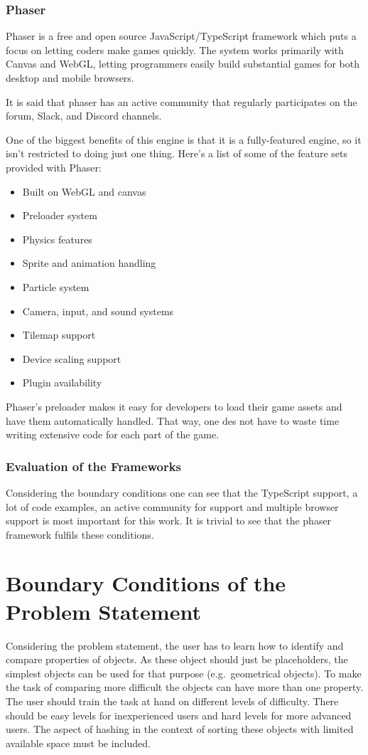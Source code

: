 \subsubsection{Phaser}
Phaser is a free and open source JavaScript/TypeScript framework which puts a focus on letting coders make games quickly.
The system works primarily with Canvas and WebGL, letting programmers easily build substantial games for both
desktop and mobile browsers.

It is said that phaser has an active community that regularly participates on the forum, Slack, and Discord channels.

One of the biggest benefits of this engine is that it is a fully-featured engine,
so it isn’t restricted to doing just one thing.
Here’s a list of some of the feature sets provided with Phaser:

\begin{itemize}
    \item Built on WebGL and canvas
    \item Preloader system
    \item Physics features
    \item Sprite and animation handling
    \item Particle system
    \item Camera, input, and sound systems
    \item Tilemap support
    \item Device scaling support
    \item Plugin availability
\end{itemize}

Phaser’s preloader makes it easy for developers to load their game assets and have them automatically handled.
That way, one des not have to waste time writing extensive code for each part of the game\cite{phaserad}.

\subsubsection{Evaluation of the Frameworks}
Considering the boundary conditions one can see that the TypeScript support, a lot of code examples,
an active community for support and multiple browser support is most important for this work.
It is trivial to see that the phaser framework fulfils these conditions.

\section{Boundary Conditions of the Problem Statement}\label{sec:boundary-conditions-of-the-problem-statement}
Considering the problem statement, the user has to learn how to identify and compare properties of objects.
As these object should just be placeholders, the simplest objects can be used for that purpose (e.g.\ geometrical objects).
To make the task of comparing more difficult the objects can have more than one property.
The user should train the task at hand on different levels of difficulty.
There should be easy levels for inexperienced users and hard levels for more advanced users.
The aspect of hashing in the context of sorting these objects with limited available space must be included.

